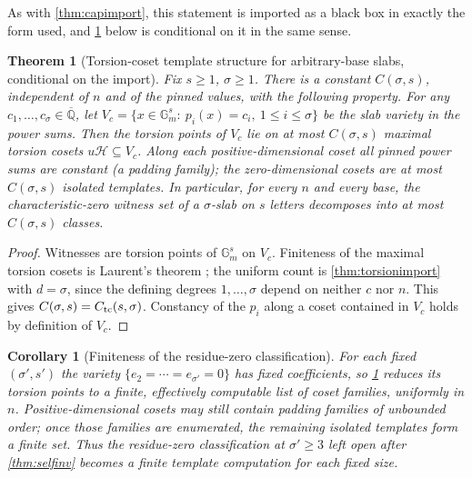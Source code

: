 \documentclass[11pt]{article}
\newtheorem{theorem}{Theorem}[section]
\newtheorem{corollary}[corollary]{Corollary}
\theoremstyle{definition}
\newcommand{\Q}{\mathbb Q}
\begin{document}
As with \cref{thm:capimport}, this statement is imported as a black box in exactly the form used, and \cref{thm:templates} below is conditional on it in the same sense.

\begin{theorem}[Torsion-coset template structure for arbitrary-base slabs, conditional on the import]\label{thm:templates}
Fix $s\ge1$, $\sigma\ge1$.  There is a constant $C(\sigma,s)$, independent of $n$ and of the pinned values, with the following property.  For any $c_1,\dots,c_\sigma\in\overline{\Q}$, let $V_c=\{x\in\mathbb G_m^s:\ p_i(x)=c_i,\ 1\le i\le\sigma\}$ be the slab variety in the power sums.  Then the torsion points of $V_c$ lie on at most $C(\sigma,s)$ maximal torsion cosets $u\mathcal H\subseteq V_c$.  Along each positive-dimensional coset all pinned power sums are constant (a padding family); the zero-dimensional cosets are at most $C(\sigma,s)$ isolated templates.  In particular, for every $n$ and every base, the characteristic-zero witness set of a $\sigma$-slab on $s$ letters decomposes into at most $C(\sigma,s)$ classes.
\end{theorem}

\begin{proof}
Witnesses are torsion points of $\mathbb G_m^s$ on $V_c$.  Finiteness of the maximal torsion cosets is Laurent's theorem \cite{Laurent84}; the uniform count is \cref{thm:torsionimport} with $d=\sigma$, since the defining degrees $1,\dots,\sigma$ depend on neither $c$ nor $n$.  This gives $C(\sigma,s)=C_{\rm tc}(s,\sigma)$.  Constancy of the $p_i$ along a coset contained in $V_c$ holds by definition of $V_c$.
\end{proof}

\begin{corollary}[Finiteness of the residue-zero classification]\label{cor:reszero}
For each fixed $(\sigma',s')$ the variety $\{e_2=\cdots=e_{\sigma'}=0\}$ has fixed coefficients, so \cref{thm:templates} reduces its torsion points to a finite, effectively computable list of coset families, uniformly in $n$.  Positive-dimensional cosets may still contain padding families of unbounded order; once those families are enumerated, the remaining isolated templates form a finite set.  Thus the residue-zero classification at $\sigma'\ge3$ left open after \cref{thm:selfinv} becomes a finite template computation for each fixed size.
\end{corollary}
\end{document}
